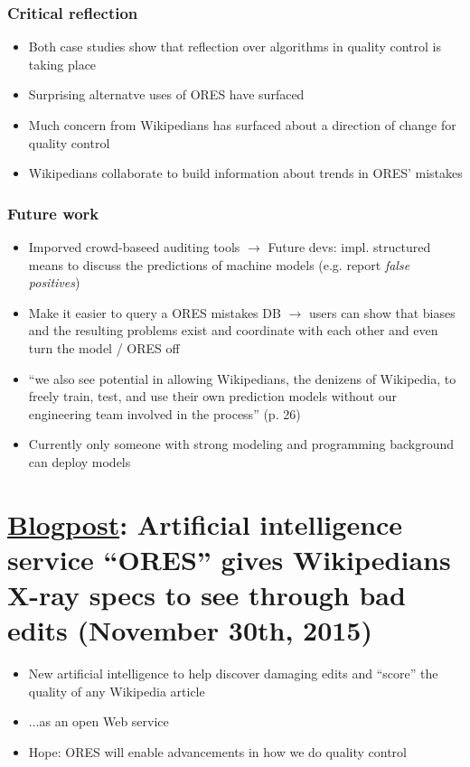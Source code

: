 \documentclass[12pt,a4paper]{article}
\begin{document}
\subsubsection{Critical reflection}
\begin{itemize}
\item Both case studies show that reflection over algorithms in quality control is taking place
\item Surprising alternatve uses of ORES have surfaced
\item Much concern from Wikipedians has surfaced about a direction of change for quality control
\item Wikipedians collaborate to build information about trends in ORES' mistakes
\end{itemize}
\subsubsection{Future work}
\begin{itemize}
\item Imporved crowd-baseed auditing tools
\(\rightarrow\) Future devs: impl. structured means to discuss the predictions of machine models (e.g. report \textit{false positives})
\item Make it easier to query a ORES mistakes DB \(\rightarrow\) users can show that biases and the resulting problems exist and coordinate with each other and even turn the model / ORES off
\item ``we also see potential in allowing Wikipedians, the denizens of Wikipedia, to freely
train, test, and use their own prediction models without our engineering team involved in
the process'' (p. 26)
\item Currently only someone with strong modeling and programming background can deploy models
\end{itemize}

\section{\href{https://blog.wikimedia.org/2015/11/30/artificial-intelligence-x-ray-specs/}{Blogpost}: Artificial intelligence service ``ORES'' gives Wikipedians X-ray specs to see through bad edits (November 30th, 2015)}
\begin{itemize}
\item New artificial intelligence to help discover damaging edits and ``score'' the quality of any Wikipedia article
\item ...as an open Web service
\item Hope: ORES will enable advancements in how we do quality control
\end{itemize}
\end{document}
